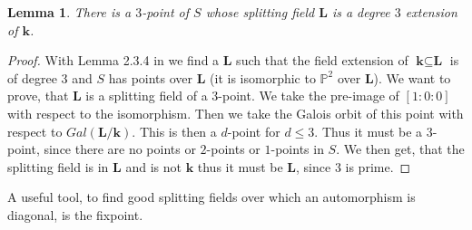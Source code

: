 \documentclass[12pt, oneside, reqno]{amsart}
\newtheorem{lemma}[theorem]{Lemma}
\begin{document}
\begin{lemma}
    There is a $3$-point of $S$ whose splitting field $\textbf{L}$ is a degree $3$ extension of $\textbf{k}$.
\end{lemma}
\begin{proof}
    With Lemma 2.3.4 in \cite{BSY} we find a $\textbf{L}$ such that the field extension of $\textbf{k} \subseteq \textbf{L}$ is of degree 3 and $S$ has points over $\textbf{L}$ (it is isomorphic to $\mathbb{P}^2$ over $\textbf{L}$). We want to prove, that $\textbf{L}$ is a splitting field of a $3$-point. We take the pre-image of $[1:0:0]$ with respect to the isomorphism. Then we take the Galois orbit of this point with respect to $Gal(\textbf{L}/\textbf{k})$. This is then a $d$-point for $d \leq 3$. Thus it must be a $3$-point, since there are no points or $2$-points or $1$-points in $S$. We then get, that the splitting field is in $\textbf{L}$ and is not $\textbf{k}$ thus it must be $\textbf{L}$, since $3$ is prime. 
\end{proof}
\noindent 
A useful tool, to find good splitting fields over which an automorphism is diagonal, is the fixpoint.
\end{document}
